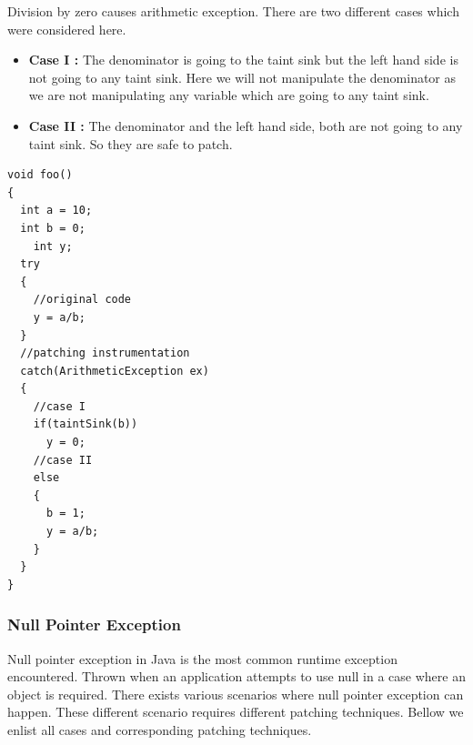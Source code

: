 Division by zero causes arithmetic exception. There are two different cases
which were considered here. 
\begin{itemize}
	\item \textbf{Case I :} The denominator is going to the taint sink but
the left hand side is not going to any taint sink. 
	Here we will not manipulate the denominator as we are not manipulating
any variable which are going to any taint sink.
	\item \textbf{Case II :} The denominator and the left hand side, both
are not going to any taint sink. So they are safe to patch.
\end{itemize}

\lstset{language=Java, caption=arithmetic exception : division-by-zero patching,
label=patchingexample2}

\begin{lstlisting}
void foo()
{
  int a = 10;
  int b = 0;
	int y;
  try
  {
    //original code
    y = a/b;
  }
  //patching instrumentation
  catch(ArithmeticException ex)
  {
    //case I
    if(taintSink(b))
      y = 0;
    //case II
    else
    {
      b = 1;
      y = a/b;
    }
  }
}
\end{lstlisting}

\subsubsection{Null Pointer Exception}

Null pointer exception in Java is the most common runtime exception
encountered. 
Thrown when an application attempts to use null in a case where an object is
required. There exists various scenarios where null pointer exception can
happen. These different scenario requires different patching techniques. Bellow
we enlist all cases and corresponding patching techniques.


